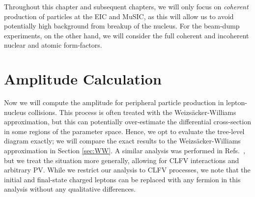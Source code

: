 Throughout this chapter and subsequent chapters, we will only focus on {\it coherent} production of particles at the EIC and MuSIC, as this will allow us to avoid potentially high background from breakup of the nucleus. For the beam-dump experiments, on the other hand, we will consider the full coherent and incoherent nuclear and atomic form-factors.

\section{Amplitude Calculation}\label{sec:amplitude_calc}
Now we will compute the amplitude for peripheral particle production in lepton-nucleus collisions. 
This process is often treated with the Weizs\"acker-Williams approximation, but this can potentially over-estimate the differential cross-section in some regions of the parameter space. Hence, we opt to evaluate the tree-level diagram exactly; we will compare the exact results to the Weizs\"acker-Williams approximation in Section \ref{sec:WW}. A similar analysis was performed in Refs.~\cite{Liu:2016mqv,Liu:2017htz}, but we treat the situation more generally, allowing for CLFV interactions and arbitrary PV. While we restrict our analysis to CLFV processes, we note that the initial and final-state charged leptons can be replaced with any fermion in this analysis without any qualitative differences.

